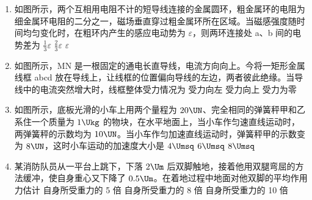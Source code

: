 \documentclass[\gkver]{gaokaozhenti}
\begin{document}
\begin{enumerate}
\item
如图所示，两个互相用电阻不计的短导线连接的金属圆环，粗金属环的电阻为细金属环电阻的二分之一，磁场垂直穿过粗金属环所在区域。当磁感强度随时间均匀变化时，在粗环内产生的感应电动势为 $\varepsilon$，则两环连接处 a、b 间的电势差为
\onepicture[w=5.5cm]{}
{$\frac{1}{3}\varepsilon$}
{$\frac{2}{3}\varepsilon$}
{$\varepsilon$}

\item
如图所示，MN 是一根固定的通电长直导线，电流方向向上。今将一矩形金属线框 abcd 放在导线上，让线框的位置偏向导线的左边，两者彼此绝缘。当导线中的电流突然增大时，线框整体受力情况为
\onepicture[w=4.5cm]{}
{受力向左}
{受力向上}
{受力为零}

\item
如图所示，底板光滑的小车上用两个量程为 $20\UN$、完全相同的弹簧秤甲和乙系住一个质量为 $1\Ukg$ 的物块，在水平地面上，当小车作匀速直线运动时，两弹簧秤的示数均为 $10\UN$。当小车作匀加速直线运动时，弹簧秤甲的示数变为 $8\UN$，这时小车运动的加速度大小是
\onepicture[w=7cm]{}
\fourchoices[answer=B]
{$2\Umsq$}
{$4\Umsq$}
{$6\Umsq$}
{$8\Umsq$}

\item
某消防队员从一平台上跳下，下落 $2\Um$ 后双脚触地，接着他用双腿弯屈的方法缓冲，使自身重心又下降了 $0.5\Um$。在着地过程中地面对他双脚的平均作用力估计
{自身所受重力的 5 倍}
{自身所受重力的 8 倍}
{自身所受重力的 10 倍}


\end{enumerate}
\end{document}
